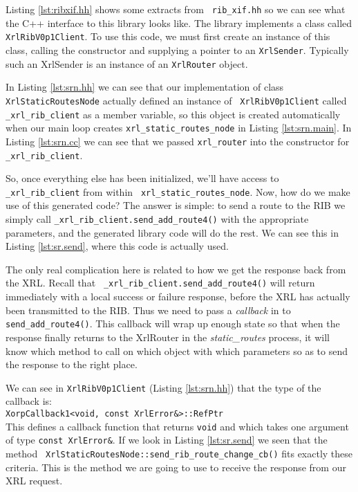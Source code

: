 \documentclass[11pt]{article}
\newcommand{\stt}{\tt\small}
\newcommand{\SRI}{{\it static\_routes}\xspace}
\begin{document}
Listing \ref{lst:ribxif.hh} shows some extracts from {\stt
rib\_xif.hh} so we can see what the C++ interface to this library
looks like.  The library implements a class called {\stt
XrlRibV0p1Client}.  To use this code, we must first create an instance
of this class, calling the constructor and supplying a pointer to an
{\stt XrlSender}.  Typically such an XrlSender is an instance of an
{\stt XrlRouter} object.  

In Listing \ref{lst:srn.hh} we can see that our implementation of class
{\stt XrlStaticRoutesNode} actually defined an instance of {\stt
XrlRibV0p1Client} called {\stt \_xrl\_rib\_client} as a member
variable, so this object is created automatically when our main loop
creates {\stt xrl\_static\_routes\_node} in Listing
\ref{lst:srn.main}.  In Listing \ref{lst:srn.cc} we can see that we
passed {\stt xrl\_router} into the constructor for {\stt
\_xrl\_rib\_client}.

So, once everything else has been initialized, we'll have access
to {\stt \_xrl\_rib\_client} from within {\stt
xrl\_static\_routes\_node}.  Now, how do we make use of this generated
code?  The answer is simple: to send a route to the RIB we simply call
{\stt \_xrl\_rib\_client.send\_add\_route4()} with the appropriate
parameters, and the generated library code will do the rest.  We can
see this in Listing \ref{lst:sr.send}, where this code is actually used.

The only real complication here is related to how we get the response
back from the XRL.  Recall that {\stt
\_xrl\_rib\_client.send\_add\_route4()} will return immediately with a local
success or failure response, before the XRL has actually been
transmitted to the RIB.  Thus we need to pass a {\it callback} in to
{\stt send\_add\_route4()}.  This callback will wrap up enough state so
that when the response finally returns to the XrlRouter in the \SRI
process, it will know which method to call on which object with which
parameters so as to send the response to the right place.

We can see in {\stt XrlRibV0p1Client} (Listing \ref{lst:srn.hh}) that
the type of the callback is:\\
{\stt XorpCallback1<void, const XrlError\&>::RefPtr}\\
This defines a callback function that returns {\stt void} and which
takes one argument of type {\stt const XrlError\&}.  If we look in
Listing \ref{lst:sr.send} we seen that the method {\stt
XrlStaticRoutesNode::send\_rib\_route\_change\_cb()} fits exactly these
criteria.  This is the method we are going to use to receive the
response from our XRL request.
\end{document}
